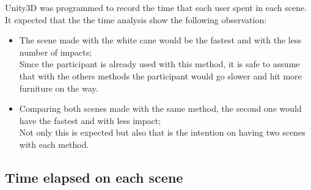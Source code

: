 %

Unity3D was programmed to record the time that each user spent in each scene. It expected that the the time analysis show the following observation:

\begin{itemize}
    \item The scene made with the white cane would be the fastest and with the less number of impacts; \\ 
    Since the participant is already used with this method, it is safe to assume that with the others methods the participant would go slower and hit more furniture on the way.
    \item Comparing both scenes made with the same method, the second one would have the fastest and with less impact; \\
    Not only this is expected but also that is the intention on having two scenes with each method.
\end{itemize}

\subsection{Time elapsed on each scene}
\label{subsec:results_collsions}



